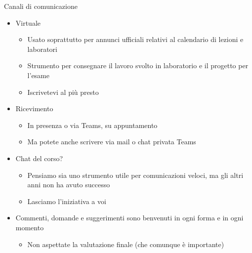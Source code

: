 \begin{frame}{Canali di comunicazione}

  \begin{itemize}[<+->]
  \item Virtuale

    \begin{itemize}[<.->]
    \item Usato soprattutto per annunci ufficiali relativi al calendario di
      lezioni e laboratori
    \item Strumento per consegnare il lavoro svolto in laboratorio e il progetto
      per l'esame
    \item Iscrivetevi al più presto
    \end{itemize}

  \item Ricevimento

    \begin{itemize}[<.->]
    \item In presenza o via Teams, su appuntamento
    \item Ma potete anche scrivere via mail o chat privata Teams
    \end{itemize}

  \item Chat del corso?

    \begin{itemize}[<.->]
    \item Pensiamo sia uno strumento utile per comunicazioni veloci, ma gli
      altri anni non ha avuto successo
    \item Lasciamo l'iniziativa a voi
    \end{itemize}

  \item Commenti, domande e suggerimenti sono benvenuti in ogni forma e in ogni
    momento
    \begin{itemize}[<.->]
    \item Non aspettate la valutazione finale (che comunque è importante)
    \end{itemize}

  \end{itemize}

\end{frame}

